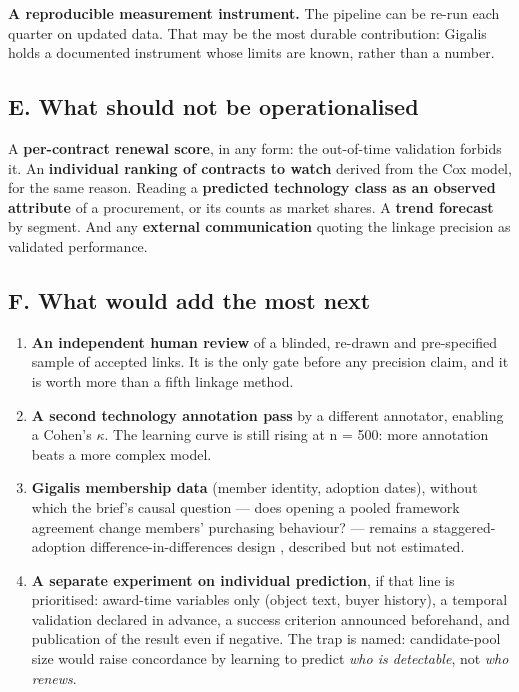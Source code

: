\textbf{A reproducible measurement instrument.} The pipeline can be re-run each quarter on updated data. That may be the most durable contribution: Gigalis holds a documented instrument whose limits are known, rather than a number.

\subsection{E. What should not be operationalised}

A \textbf{per-contract renewal score}, in any form: the out-of-time validation forbids it. An \textbf{individual ranking of contracts to watch} derived from the Cox model, for the same reason. Reading a \textbf{predicted technology class as an observed attribute} of a procurement, or its counts as market shares. A \textbf{trend forecast} by segment. And any \textbf{external communication} quoting the linkage precision as validated performance.

\subsection{F. What would add the most next}

\begin{enumerate}
\def\labelenumi{\arabic{enumi}.}
\tightlist
\item
  \textbf{An independent human review} of a blinded, re-drawn and pre-specified sample of accepted links. It is the only gate before any precision claim, and it is worth more than a fifth linkage method.
\item
  \textbf{A second technology annotation pass} by a different annotator, enabling a Cohen's $\kappa$. The learning curve is still rising at n = 500: more annotation beats a more complex model.
\item
  \textbf{Gigalis membership data} (member identity, adoption dates), without which the brief's causal question --- does opening a pooled framework agreement change members' purchasing behaviour? --- remains a staggered-adoption difference-in-differences design \citep{callaway2021}, described but not estimated.
\item
  \textbf{A separate experiment on individual prediction}, if that line is prioritised: award-time variables only (object text, buyer history), a temporal validation declared in advance, a success criterion announced beforehand, and publication of the result even if negative. The trap is named: candidate-pool size would raise concordance by learning to predict \emph{who is detectable}, not \emph{who renews}.
\end{enumerate}
